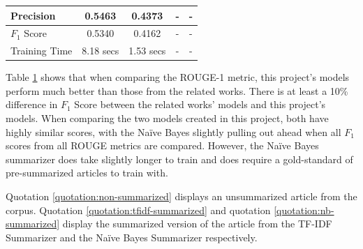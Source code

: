 \documentclass{IEEEtran}
\begin{document}
\begin{table}[h]
\begin{tabular}{|lcccc|}
\multicolumn{1}{|l|}{Precision}     & \multicolumn{1}{c|}{0.5463}      & \multicolumn{1}{c|}{0.4373}    & \multicolumn{1}{c|}{-}                 & -              \\ \hline
\multicolumn{1}{|l|}{$F_1$ Score}    & \multicolumn{1}{c|}{0.5340}      & \multicolumn{1}{c|}{0.4162}    & \multicolumn{1}{c|}{-}                 & -              \\ \hline
\multicolumn{1}{|l|}{Training Time} & \multicolumn{1}{c|}{8.18 secs}   & \multicolumn{1}{c|}{1.53 secs} & \multicolumn{1}{c|}{-}                 & -              \\ \hline
\end{tabular}
\label{table:results_comparison}
\end{table}

Table \ref{table:results_comparison} shows that when comparing the ROUGE-1 metric, this project's models perform much better than those from the related works. There is at least a 10\% difference in $F_1$ Score between the related works' models and this project's models. When comparing the two models created in this project, both have highly similar scores, with the Na\"{i}ve Bayes slightly pulling out ahead when all $F_1$ scores from all ROUGE metrics are compared. However, the Na\"{i}ve Bayes summarizer does take slightly longer to train and does require a gold-standard of pre-summarized articles to train with.

Quotation \ref{quotation:non-summarized} displays an unsummarized article from the corpus. Quotation \ref{quotation:tfidf-summarized} and quotation \ref{quotation:nb-summarized} display the summarized version of the article from the TF-IDF Summarizer and the Na\"{i}ve Bayes Summarizer respectively. 
\end{document}
